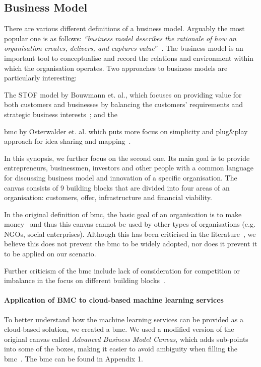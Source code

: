 \subsection{Business Model}\label{sec:business-model}

There are various different definitions of a business model. Arguably the most popular one is as follows: \textit{``business model describes the rationale of how an organisation creates, delivers, and captures value}''~\cite{Osterwalder2010BusinessChallengers}. The business model is an important tool to conceptualise and record the relations and environment within which the organisation operates. Two approaches to business models are particularly interesting:
\begin{enumerate*}[label=(\roman*)] 
    \item The STOF model by Bouwmann et. al., which focuses on providing value for both customers and businesses by balancing the customers' requirements and strategic business interests~\cite{Bouwman2008ServiceModels}; and the
    \item \acrfull{bmc} by Osterwalder et. al. which puts more focus on simplicity and plug\&play approach for idea sharing and mapping~\cite{Hong2013CriticismsCanvas}.
\end{enumerate*}
 
In this synopsis, we further focus on the second one. Its main goal is to provide entrepreneurs, businessmen, investors and other people with a common language for discussing business model and innovation of a specific organisation. The canvas consists of 9 building blocks that are divided into four areas of an organisation: customers, offer, infrastructure and financial viability.

In the original definition of \acrshort{bmc}, the basic goal of an organisation is to make money~\cite[p. 21]{Osterwalder2010BusinessChallengers} and thus this canvas cannot be used by other types of organisations (e.g. NGOs, social enterprises). Although this has been criticised in the literature~\cite{Hong2013CriticismsCanvas}, we believe this does not prevent the \acrshort{bmc} to be widely adopted, nor does it prevent it to be applied on our scenario.

Further criticism of the \acrshort{bmc} include lack of consideration for competition or imbalance in the focus on different building blocks~\cite{Hong2013CriticismsCanvas}.

\paragraph{Application of BMC to cloud-based machine learning services}
To better understand how the machine learning services can be provided as a cloud-based solution, we created a \acrshort{bmc}. We used a modified version of the original canvas called \textit{Advanced Business Model Canvas}, which adds sub-points into some of the boxes, making it easier to avoid ambiguity when filling the \acrshort{bmc}~\cite{King2017BusinessInstructions, Hong2013CriticismsCanvas}. The \acrshort{bmc} can be found in Appendix 1.

